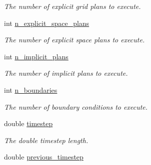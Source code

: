 \begin{DoxyCompactItemize}
\begin{DoxyCompactList}\small\item\em The number of explicit grid plans to execute. \end{DoxyCompactList}\item 
\hypertarget{classbases_1_1element_addbb10b83c789f862271c10ef3e1d596}{int \hyperlink{classbases_1_1element_addbb10b83c789f862271c10ef3e1d596}{n\-\_\-explicit\-\_\-space\-\_\-plans}}\label{classbases_1_1element_addbb10b83c789f862271c10ef3e1d596}

\begin{DoxyCompactList}\small\item\em The number of explicit space plans to execute. \end{DoxyCompactList}\item 
\hypertarget{classbases_1_1element_a7ff41fe1e907e2afba9f6c3e770ff46c}{int \hyperlink{classbases_1_1element_a7ff41fe1e907e2afba9f6c3e770ff46c}{n\-\_\-implicit\-\_\-plans}}\label{classbases_1_1element_a7ff41fe1e907e2afba9f6c3e770ff46c}

\begin{DoxyCompactList}\small\item\em The number of implicit plans to execute. \end{DoxyCompactList}\item 
\hypertarget{classbases_1_1element_a8ce271217c13987fced96c4c92398148}{int \hyperlink{classbases_1_1element_a8ce271217c13987fced96c4c92398148}{n\-\_\-boundaries}}\label{classbases_1_1element_a8ce271217c13987fced96c4c92398148}

\begin{DoxyCompactList}\small\item\em The number of boundary conditions to execute. \end{DoxyCompactList}\item 
\hypertarget{classbases_1_1element_ac0bd283b49358bd1f5a0b6ec0e1daae0}{double \hyperlink{classbases_1_1element_ac0bd283b49358bd1f5a0b6ec0e1daae0}{timestep}}\label{classbases_1_1element_ac0bd283b49358bd1f5a0b6ec0e1daae0}

\begin{DoxyCompactList}\small\item\em The double timestep length. \end{DoxyCompactList}\item 
\hypertarget{classbases_1_1element_ad3ea8bf4f7e4e7016adb50f37023a14f}{double \hyperlink{classbases_1_1element_ad3ea8bf4f7e4e7016adb50f37023a14f}{previous\-\_\-timestep}}\label{classbases_1_1element_ad3ea8bf4f7e4e7016adb50f37023a14f}


\end{DoxyCompactItemize}
